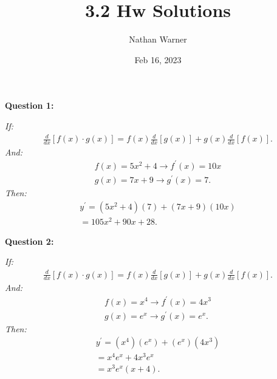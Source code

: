\documentclass{report}
\title{\Huge{3.2 Hw Solutions}}
\author{\huge{Nathan Warner}}
\date{\huge{Feb 16, 2023}}
\begin{document}
    \maketitle
    \begin{Large}
        \noindent \textbf{Question 1:}
    \end{Large}
    \bigbreak \noindent 
    \bigbreak \noindent 
    \textit{If:}
    \begin{align*}
        \frac{d}{dx}[f(x) \cdot g(x)] = f(x) \frac{d}{dx}[g(x)] + g(x) \frac{d}{dx}[f(x)]
    .\end{align*}
    \bigbreak \noindent 
    \textit{And:}
    \begin{align*}
        f(x) = 5x^2+4 \longrightarrow f ^{\prime}(x) = 10x \\ 
        g(x) = 7x+9 \longrightarrow g ^{\prime}(x) = 7
    .\end{align*}
    \textit{Then:}
    \begin{align*}
        y ^{\prime} = (5x^2+4)(7) + (7x+9)(10x) \\ 
        = 105x^2+90x+28
    .\end{align*}

    \bigbreak \noindent \bigbreak \noindent 
    \begin{Large}
        \textbf{Question 2:}
    \end{Large}
    \bigbreak \noindent 
    \bigbreak \noindent 
    \textit{If:}
    \begin{align*}
        \frac{d}{dx}[f(x) \cdot g(x)] = f(x) \frac{d}{dx}[g(x)] + g(x) \frac{d}{dx}[f(x)]
    .\end{align*}
    \bigbreak \noindent 
    \textit{And:}
    \begin{align*}
        f(x) = x^4 \longrightarrow f ^{\prime}(x) = 4x^3 \\ 
        g(x) = e^x \longrightarrow g ^{\prime}(x) = e^x
   .\end{align*}
   \bigbreak \noindent 
   \textit{Then:}
   \begin{align*}
       y ^{\prime} = (x^4)(e^x) + (e^x)(4x^3) \\ 
       = x^4e^x + 4x^3e^x \\
       = x^3e^x(x+4)
   .\end{align*}
\end{document}
